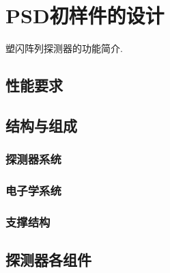 \chapter{PSD初样件的设计}
塑闪阵列探测器的功能简介.

\section{性能要求}

\section{结构与组成}
\subsection{探测器系统}
\subsection{电子学系统}
\subsection{支撑结构}

\section{探测器各组件}